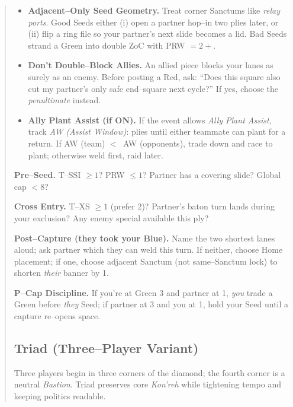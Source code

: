 \documentclass[11pt]{article}
\begin{document}
\begin{quote}
\begin{itemize}[leftmargin=1.3em,itemsep=0.3em]
  \item \textbf{Adjacent–Only Seed Geometry.}
  Treat corner Sanctums like \emph{relay ports}. Good Seeds either (i) open a partner hop–in two plies later, or (ii) flip a ring file so your partner’s next slide becomes a lid. Bad Seeds strand a Green into double ZoC with PRW $=2+$.

  \item \textbf{Don’t Double–Block Allies.}
  An allied piece blocks your lanes as surely as an enemy. Before posting a Red, ask: “Does this square also cut my partner’s only safe end–square next cycle?” If yes, choose the \emph{penultimate} instead.

  \item \textbf{Ally Plant Assist (if ON).}
  If the event allows \emph{Ally Plant Assist}, track \emph{AW (Assist Window)}: plies until either teammate can plant for a return. If AW (team) $<\,$ AW (opponents), trade down and race to plant; otherwise weld first, raid later.

\end{itemize}

\medskip
\begin{tcolorbox}[enhanced,breakable,title={Team Checklists (Say it before you move)},
  colback=white,colframe=royal,boxrule=0.8pt]
\small
\textbf{Pre–Seed.} T–SSI $\ge 1$? PRW $\le 1$? Partner has a covering slide? Global cap $<8$?

\textbf{Cross Entry.} T–XS $\ge 1$ (prefer 2)? Partner’s baton turn lands during your exclusion? Any enemy special available this ply?

\textbf{Post–Capture (they took your Blue).} Name the two shortest lanes aloud; ask partner which they can weld this turn. If neither, choose Home placement; if one, choose adjacent Sanctum (not same–Sanctum lock) to shorten \emph{their} banner by 1.

\textbf{P–Cap Discipline.} If you’re at Green 3 and partner at 1, \emph{you} trade a Green before \emph{they} Seed; if partner at 3 and you at 1, hold your Seed until a capture re–opens space.
\end{tcolorbox}
\clearpage

\subsection{Triad (Three–Player Variant)}
\label{sec:triad}

\noindent Three players begin in three corners of the diamond; the fourth corner is a neutral \emph{Bastion}. Triad preserves core \emph{Kon'reh} while tightening tempo and keeping politics readable.


\end{quote}
\end{document}

